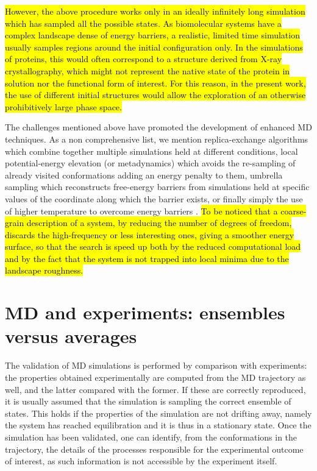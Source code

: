 \hl{However, the above procedure works only in an ideally infinitely long simulation which has sampled all the possible states. As biomolecular systems have a complex landscape dense of energy barriers, a realistic, limited time simulation usually samples regions around the initial configuration only.
%
In the simulations of proteins, this would often correspond to a structure derived from X-ray crystallography, which might not represent the native state of the protein in solution nor the functional form of interest.
%
For this reason, in the present work, the use of different initial structures would allow the exploration of an otherwise prohibitively large phase space.}

The challenges mentioned above have promoted the development of enhanced MD techniques. As a non comprehensive list, we mention replica-exchange algorithms \cite{Okamoto2004} which combine together multiple simulations held at different conditions, local potential-energy elevation (or metadynamics) \cite{Huber1994,Laio2002} which avoids the re-sampling of already visited conformations adding an energy penalty to them, umbrella sampling \cite{Torrie1977} which reconstructs free-energy barriers from simulations held at specific values of the coordinate along which the barrier exists, or finally simply the use of higher temperature to overcome energy barriers \cite{Kirkpatrick1983}.
%
\hl{To be noticed that a coarse-grain description of a system, by reducing the number of degrees of freedom, discards the high-frequency or less interesting ones, giving a smoother energy surface, so that the search is speed up both by the reduced computational load and by the fact that the system is not trapped into local minima due to the landscape roughness.}


\section{MD and experiments: ensembles versus averages}
The validation of MD simulations is performed by comparison with experiments: the properties obtained experimentally are computed from the MD trajectory as well, and the latter compared with the former. If these are correctly reproduced, it is usually assumed that the simulation is sampling the correct ensemble of states. This holds if the properties of the simulation are not drifting away, namely the system has reached equilibration and it is thus in a stationary state.
%
Once the simulation has been validated, one can identify, from the conformations in the trajectory, the details of the processes responsible for the experimental outcome of interest, as such information is not accessible by the experiment itself.

